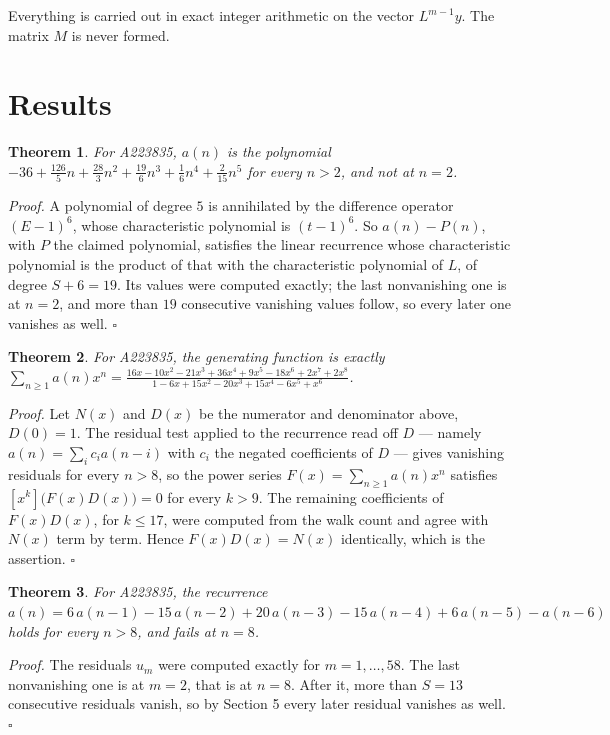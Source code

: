 \documentclass[11pt]{article}
\newtheorem{theorem}{Theorem}
\theoremstyle{definition}
\begin{document}
Everything is carried out in exact integer arithmetic on the vector $L^{m-1}y$. The matrix $M$ is never formed.

\section{Results}

\begin{theorem} For A223835, $a(n)$ is the polynomial $-36 + \frac{126}{5}n + \frac{28}{3}n^{2} + \frac{19}{6}n^{3} + \frac{1}{6}n^{4} + \frac{2}{15}n^{5}$ for every $n > 2$, and not at $n = 2$.\end{theorem}

{\itshape Proof.} A polynomial of degree $5$ is annihilated by the difference operator $(E-1)^{6}$, whose characteristic polynomial is $(t-1)^{6}$. So $a(n) - P(n)$, with $P$ the claimed polynomial, satisfies the linear recurrence whose characteristic polynomial is the product of that with the characteristic polynomial of $L$, of degree $S + 6 = 19$. Its values were computed exactly; the last nonvanishing one is at $n = 2$, and more than $19$ consecutive vanishing values follow, so every later one vanishes as well. $\square$

\begin{theorem} For A223835, the generating function is exactly $\sum_{n\ge 1} a(n)x^n = \frac{16x - 10x^{2} - 21x^{3} + 36x^{4} + 9x^{5} - 18x^{6} + 2x^{7} + 2x^{8}}{1 - 6x + 15x^{2} - 20x^{3} + 15x^{4} - 6x^{5} + x^{6}}$.\end{theorem}

{\itshape Proof.} Let $N(x)$ and $D(x)$ be the numerator and denominator above, $D(0)=1$. The residual test applied to the recurrence read off $D$ --- namely $a(n) = \sum_i c_i a(n-i)$ with $c_i$ the negated coefficients of $D$ --- gives vanishing residuals for every $n > 8$, so the power series $F(x)=\sum_{n\ge 1}a(n)x^n$ satisfies $[x^k]\bigl(F(x)D(x)\bigr) = 0$ for every $k > 9$. The remaining coefficients of $F(x)D(x)$, for $k \le 17$, were computed from the walk count and agree with $N(x)$ term by term. Hence $F(x)D(x) = N(x)$ identically, which is the assertion. $\square$

\begin{theorem} For A223835, the recurrence $a(n) = 6\,a(n-1) - 15\,a(n-2) + 20\,a(n-3) - 15\,a(n-4) + 6\,a(n-5) - a(n-6)$ holds for every $n > 8$, and fails at $n = 8$.\end{theorem}

{\itshape Proof.} The residuals $u_m$ were computed exactly for $m = 1,\dots,58$. The last nonvanishing one is at $m = 2$, that is at $n = 8$. After it, more than $S = 13$ consecutive residuals vanish, so by Section 5 every later residual vanishes as well. $\square$
\end{document}
